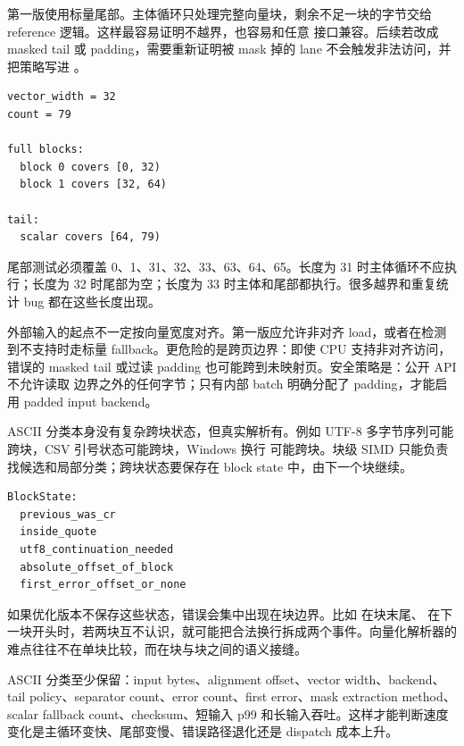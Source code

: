 第一版使用标量尾部。主体循环只处理完整向量块，剩余不足一块的字节交给 reference 逻辑。这样最容易证明不越界，也容易和任意  接口兼容。后续若改成 masked tail 或 padding，需要重新证明被 mask 掉的 lane 不会触发非法访问，并把策略写进 。

\begin{lstlisting}[numbers=none,caption={尾部处理账本}]
vector_width = 32
count = 79

full blocks:
  block 0 covers [0, 32)
  block 1 covers [32, 64)

tail:
  scalar covers [64, 79)
\end{lstlisting}

尾部测试必须覆盖 0、1、31、32、33、63、64、65。长度为 31 时主体循环不应执行；长度为 32 时尾部为空；长度为 33 时主体和尾部都执行。很多越界和重复统计 bug 都在这些长度出现。

外部输入的起点不一定按向量宽度对齐。第一版应允许非对齐 load，或者在检测到不支持时走标量 fallback。更危险的是跨页边界：即使 CPU 支持非对齐访问，错误的 masked tail 或过读 padding 也可能跨到未映射页。安全策略是：公开 API 不允许读取  边界之外的任何字节；只有内部 batch 明确分配了 padding，才能启用 padded input backend。

ASCII 分类本身没有复杂跨块状态，但真实解析有。例如 UTF-8 多字节序列可能跨块，CSV 引号状态可能跨块，Windows 换行  可能跨块。块级 SIMD 只能负责找候选和局部分类；跨块状态要保存在 block state 中，由下一个块继续。

\begin{lstlisting}[numbers=none,caption={块状态摘要的语义形态}]
BlockState:
  previous_was_cr
  inside_quote
  utf8_continuation_needed
  absolute_offset_of_block
  first_error_offset_or_none
\end{lstlisting}

如果优化版本不保存这些状态，错误会集中出现在块边界。比如  在块末尾、 在下一块开头时，若两块互不认识，就可能把合法换行拆成两个事件。向量化解析器的难点往往不在单块比较，而在块与块之间的语义接缝。

ASCII 分类至少保留：input bytes、alignment offset、vector width、backend、tail policy、separator count、error count、first error、mask extraction method、scalar fallback count、checksum、短输入 p99 和长输入吞吐。这样才能判断速度变化是主循环变快、尾部变慢、错误路径退化还是 dispatch 成本上升。

